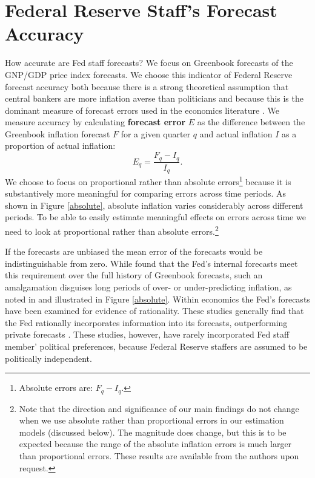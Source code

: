 \documentclass[a4paper]{article}\usepackage{graphicx, color}
\begin{document}
\section{Federal Reserve Staff's Forecast Accuracy}\label{ForecastAcc}

How accurate are Fed staff forecasts? We focus on Greenbook forecasts of the GNP/GDP price index forecasts. We choose this indicator of Federal Reserve forecast accuracy both because there is a strong theoretical assumption that central bankers are more inflation averse than politicians \citep[e.g.][]{Cukierman1992,Mukherjee2008,Tillmann2008} and because this is the dominant measure of forecast errors used in the economics literature \citep[c.f.][]{Romer2000}. We measure accuracy by calculating {\bf{forecast error}} $E$ as the difference between the Greenbook inflation forecast $F$ for a given quarter $q$ and actual inflation $I$ as a proportion of actual inflation:
%
\begin{equation}
    E_{q} = \frac{F_{q} - I_{q}}{I_{q}}.
\end{equation}
%
We choose to focus on proportional rather than absolute errors\footnote{Absolute errors are: $F_{q} - I_{q}$.} because it is substantively more meaningful for comparing errors across time periods. As shown in Figure \ref{absolute}, absolute inflation varies considerably across different periods. To be able to easily estimate meaningful effects on errors across time we need to look at proportional rather than absolute errors.\footnote{Note that the direction and significance of our main findings do not change when we use absolute rather than proportional errors in our estimation models (discussed below). The magnitude does change, but this is to be expected because the range of the absolute inflation errors is much larger than proportional errors. These results are available from the authors upon request.}

If the forecasts are unbiased the mean error of the forecasts would be indistinguishable from zero. While \cite{Romer2000} found that the Fed's internal forecasts  meet this requirement over the full history of Greenbook forecasts, such an amalgamation disguises long periods of over- or under-predicting inflation, as noted in \cite{Capistran2006} and illustrated in Figure \ref{absolute}. Within economics the Fed's forecasts have been examined for evidence of rationality. These studies generally find that the Fed rationally incorporates information into its forecasts, outperforming private forecasts \cite[c.f.][]{Gamber2009}. These studies, however, have rarely incorporated Fed staff member' political preferences, because Federal Reserve staffers are assumed to be politically independent.
\end{document}
